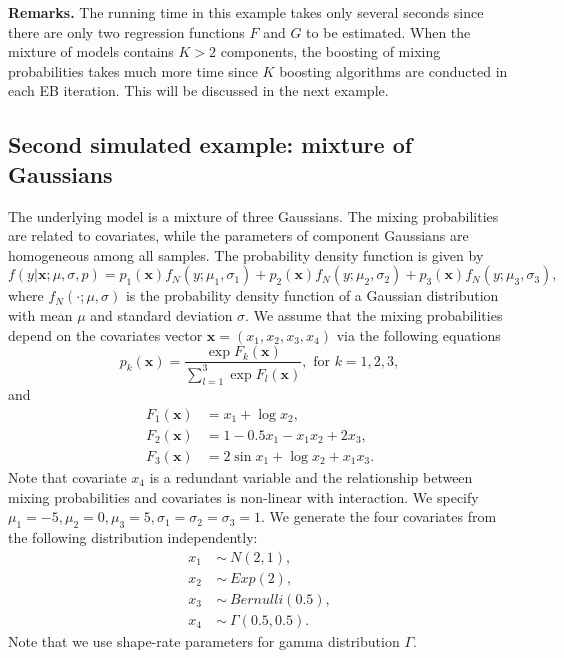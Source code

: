 \documentclass[11pt]{article}
\numberwithin{equation}{section}
\def\bx{\boldsymbol{x}}
\begin{document}
{\bf Remarks.} The running time in this example takes only several seconds since there are only two regression functions $F$ and $G$ to be estimated.
When the mixture of models contains $K>2$ components, the boosting of mixing probabilities takes much more time since $K$ boosting algorithms are conducted in each EB iteration. This will be discussed in the next example.

\subsection{Second simulated example: mixture of Gaussians}

The underlying model is a mixture of three Gaussians. The mixing probabilities are related to covariates, while the parameters of component Gaussians are homogeneous among all samples.
The probability density function is given by
\begin{equation}
f(y|\bx; \mu,\sigma,p)=p_1(\bx)f_N(y;\mu_1,\sigma_1)+p_2(\bx)f_N(y;\mu_2,\sigma_2)+p_3(\bx)f_N(y;\mu_3,\sigma_3),
\end{equation}
where $f_N(\cdot;\mu,\sigma)$ is the probability density function of a Gaussian distribution with mean $\mu$ and standard deviation $\sigma$.
We assume that the mixing probabilities depend on the covariates vector $\bx=(x_1,x_2,x_3,x_4)$ via the following equations
\begin{equation}\label{logistic}
	p_k(\bx)=\frac{\exp{F_k(\bx)}}{\sum_{l=1}^{3}\exp{F_l(\bx)}}, \text{ for } k=1,2,3,
\end{equation}
and 
\begin{align*}
F_1(\bx)&=x_1+\log x_2,\\
 F_2(\bx)&=1-0.5x_1-x_1x_2+2x_3, \\
  F_3(\bx)&=2\sin x_1+\log x_2 + x_1x_3.
	\end{align*}
Note that covariate $x_4$ is a redundant variable and the relationship between mixing probabilities and covariates is non-linear with interaction. 
We specify $\mu_1=-5,\mu_2=0,\mu_3=5, \sigma_1=\sigma_2=\sigma_3=1$. We generate the four covariates from the following distribution independently:
   \begin{align*}
   	x_1~&\sim~ N(2,1),\\
   	x_2~&\sim~ Exp(2), \\
   	x_3~&\sim~ Bernulli(0.5), \\
   	x_4~&\sim~ \Gamma(0.5,0.5).
   \end{align*}
Note that we use shape-rate parameters for gamma distribution $\Gamma$.
\end{document}
